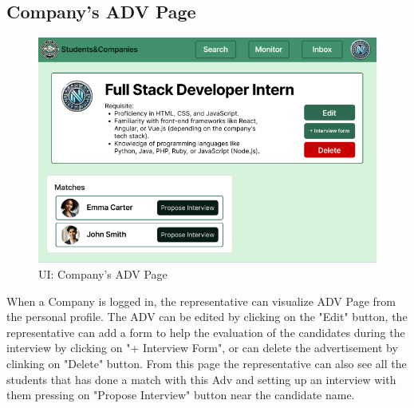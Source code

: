 \subsection{Company's ADV Page}
\begin{figure}[H]
    \centering
    \includegraphics[width=15cm]{images/ui/advpage(1).png}
    \caption{UI: Company's ADV Page}
\end{figure}
When a Company is logged in, the representative can visualize ADV Page from the personal profile. The ADV can be edited by clicking on the "Edit" button, the representative can add a form to help the evaluation of the candidates during the interview by clicking on "+ Interview Form", or can delete the advertisement by clinking on "Delete" button. From this page the representative can also see all the students that has done a match with this Adv and setting up an interview with them pressing on "Propose Interview" button near the candidate name.


